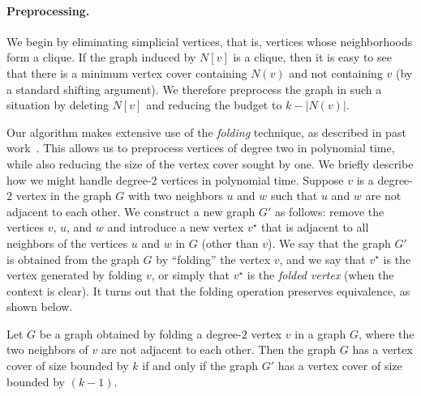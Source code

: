 \documentclass[svgnames]{llncs}
\begin{document}
\paragraph{Preprocessing.} 

We begin by eliminating simplicial vertices, that is, vertices whose neighborhoods form a clique. If the graph induced by $N[v]$ is a clique, then it is easy to see that there is a minimum vertex cover containing $N(v)$ and not containing $v$ (by a standard shifting argument). We therefore preprocess the graph in such a situation by deleting $N[v]$ and reducing the budget to $k - |N(v)|$. 




Our algorithm makes extensive use of the \emph{folding} technique, as described in past work~\cite{CKJ99,CKX06}. This allows us to preprocess vertices of degree two in polynomial time, while also reducing the size of the vertex cover sought by one. We briefly describe how we might handle degree-2 vertices in polynomial time.
Suppose $v$ is a degree-$2$ vertex in the graph $G$ with two neighbors $u$ and $w$ such that $u$ and $w$ are not adjacent to each other. We construct a new graph $G'$ as follows: 
remove the vertices $v$, $u$, and $w$ and introduce a new 
vertex $v^\star$ that is adjacent to all neighbors of the vertices $u$ and $w$ in $G$ (other than $v$). We say that the graph $G'$ is obtained from the graph $G$ by ``folding'' the vertex $v$, and we say 
that $v^\star$ is the vertex generated by folding $v$, or simply that $v^\star$ is the \emph{folded vertex} (when the context is clear). It turns out that the folding operation preserves equivalence, as shown below. 

\begin{proposition}\cite[Lemma 2.3]{CKJ99}
Let $G$ be a graph obtained by folding a degree-$2$ vertex $v$ in a graph $G$, where the two neighbors of $v$ are not adjacent to each other. Then the graph $G$ has a vertex cover of size bounded by $k$ if and only if the graph $G'$ has a vertex cover of size bounded by $(k - 1)$.
\end{proposition}
\end{document}
